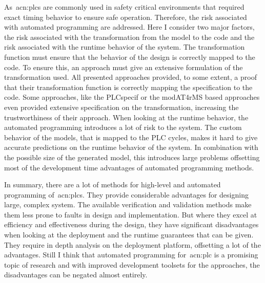As~\acrshort{acn:plc}s are commonly used in safety critical environments that required exact timing behavior to ensure safe operation.
Therefore, the risk associated with automated programming are addressed.
Here I consider two major factors, the risk associated with the transformation from the model to the code and the risk associated with the runtime behavior of the system.
The transformation function must ensure that the behavior of the design is correctly mapped to the code.
To ensure this, an approach must give an extensive formulation of the transformation used.
All presented approaches provided, to some extent, a proof that their transformation function is correctly mapping the specification to the code.
Some approaches, like the PLCspecif or the modAT4rMS based approaches even provided extensive specification on the transformation, increasing the trustworthiness of their approach.
When looking at the runtime behavior, the automated programming introduces a lot of risk to the system.
The custom behavior of the models, that is mapped to the PLC cycles, makes it hard to give accurate predictions on the runtime behavior of the system.
In combination with the possible size of the generated model, this introduces large problems offsetting most of the development time advantages of automated programming methods.

In summary, there are a lot of methods for high-level and automated programming of~\acrlong{acn:plc}s.
They provide considerable advantages for designing large, complex system.
The available verification and validation methods make them less prone to faults in design and implementation.
But where they excel at efficiency and effectiveness during the design, they have significant disadvantages when looking at the deployment and the runtime guarantees that can be given.
They require in depth analysis on the deployment platform, offsetting a lot of the advantages.
Still I think that automated programming for~\acrshort{acn:plc} is a promising topic of research and with improved development toolsets for the approaches, the disadvantages can be negated almost entirely.
